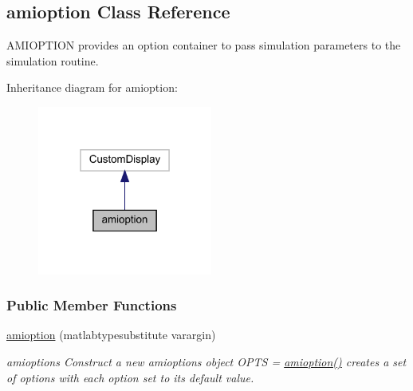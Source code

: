 \hypertarget{classamioption}{}\subsection{amioption Class Reference}
\label{classamioption}


A\+M\+I\+O\+P\+T\+I\+ON provides an option container to pass simulation parameters to the simulation routine.  




Inheritance diagram for amioption\+:
\nopagebreak
\begin{figure}[H]
\begin{center}
\leavevmode
\includegraphics[width=163pt]{classamioption__inherit__graph}
\end{center}
\end{figure}
\subsubsection*{Public Member Functions}
\begin{DoxyCompactItemize}
\item 
\mbox{\hyperlink{classamioption_a86c655c4010c1c2ddb3e68693a07ef37}{amioption}} (matlabtypesubstitute varargin)
\begin{DoxyCompactList}\small\item\em amioptions Construct a new amioptions object O\+P\+TS = \mbox{\hyperlink{classamioption_a86c655c4010c1c2ddb3e68693a07ef37}{amioption()}} creates a set of options with each option set to its default value. \end{DoxyCompactList}\end{DoxyCompactItemize}
